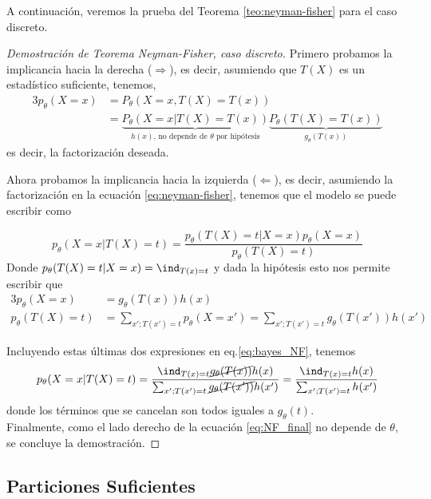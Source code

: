 A continuación, veremos la prueba del Teorema \ref{teo:neyman-fisher} para el caso discreto. 


\begin{proof}[Demostración de Teorema Neyman-Fisher, caso discreto]
Primero probamos la implicancia hacia la derecha ($\Rightarrow$), es decir, asumiendo que $T(X)$ es un estadístico suficiente, tenemos,
	\begin{alignat*}{3}
		p_\theta(X=x) 	&= P_\theta(X=x, T(X)=T(x))\\
						&= \underbrace{P_\theta(X=x| T(X)=T(x))}_{h(x)\text{, no depende de $\theta$ por hipótesis}} \underbrace{P_\theta(T(X)=T(x))}_{g_\theta(T(x))}
	\end{alignat*}
	es decir, la factorización deseada.

	Ahora probamos la implicancia hacia la izquierda ($\Leftarrow$), es decir, asumiendo la factorización en la ecuación \eqref{eq:neyman-fisher}, tenemos que el modelo se puede escribir como 

	\begin{equation*}
		\label{eq:bayes_NF}
		p_\theta(X=x|T(X)=t)=  \frac{p_\theta(T(X)=t|X=x)p_\theta(X=x)}{p_\theta(T(X)=t)}
	\end{equation*}
	Donde $p_\theta(T(X)=t|X=x)= \ind_{T(x)=t}$ y dada la hipótesis esto nos permite escribir que
	\begin{alignat*}{3}
		p_\theta(X=x)&=  g_\theta(T(x))h(x)\\
		p_\theta(T(X)=t) &= \sum_{x';T(x')=t}p_\theta(X=x') = \sum_{x';T(x')=t}g_\theta(T(x'))h(x')
	\end{alignat*}

	Incluyendo estas últimas dos expresiones en eq.\eqref{eq:bayes_NF}, tenemos 
	\begin{equation}
		\label{eq:NF_final}
		p_\theta(X=x|T(X)=t)=  \frac{\ind_{T(x)=t}\cancel{g_\theta(T(x))}h(x)}{\sum_{x';T(x')=t}\cancel{g_\theta(T(x'))}h(x')}=  \frac{\ind_{T(x)=t}h(x)}{\sum_{x';T(x')=t}h(x')}
	\end{equation}
	donde los términos que se cancelan son todos iguales a $g_\theta(t)$.\\

	Finalmente, como el lado derecho de la ecuación \eqref{eq:NF_final} no depende de $\theta$, se concluye la demostración.
\end{proof}

\subsection{Particiones Suficientes}

